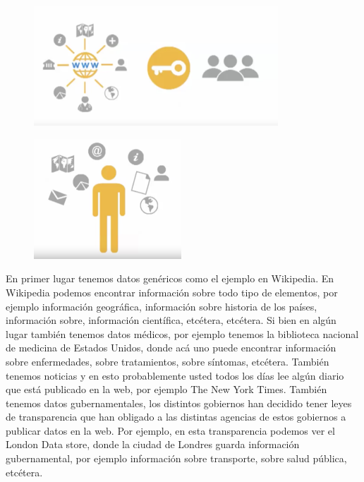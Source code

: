 \begin{figure}[H]
	\centering
	\includegraphics[height=4.5cm]{imagenes/capitulo3/5}
	\caption{}
\end{figure}

\begin{figure}[H]
	\centering
	\includegraphics[height=4.5cm]{imagenes/capitulo3/6}
	\caption{}
\end{figure}

En primer lugar tenemos datos genéricos como el ejemplo en Wikipedia. En Wikipedia podemos encontrar información sobre todo tipo de elementos, por ejemplo información geográfica, información sobre historia de los países, información sobre, información científica, etcétera, etcétera. Si bien en algún lugar también tenemos datos médicos, por ejemplo tenemos la biblioteca nacional de medicina de Estados Unidos, donde acá uno puede encontrar información sobre enfermedades, sobre tratamientos, sobre síntomas, etcétera. También tenemos noticias y en esto probablemente usted todos los días lee algún diario que está publicado en la web, por ejemplo The New York Times. También tenemos datos gubernamentales, los distintos gobiernos han decidido tener leyes de transparencia que han obligado a las distintas agencias de estos gobiernos a publicar datos en la web. Por ejemplo, en esta transparencia podemos ver el London Data store, donde la ciudad de Londres guarda información gubernamental, por ejemplo información sobre transporte, sobre salud pública, etcétera.

